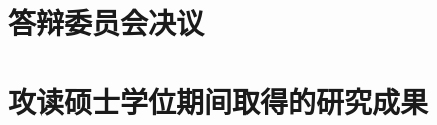 \chapter{答辩委员会决议}



\chapter{攻读硕士学位期间取得的研究成果}%
 \begin{enumerate}[label={[\arabic*]}]
  \item 
  \end{enumerate}